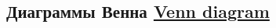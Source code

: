 \documentclass[a4paper,10pt]{article}
\begin{document}
\begin{multicols}{2}
\begin{terms}

\end{terms}
\end{multicols}


\newpage


\subsection{Диаграммы Венна%
\texorpdfstring{\hfill\normalfont\href{https://en.wikipedia.org/wiki/Venn_diagram}{Venn diagram}}{}}

\def\firstcircle{(0,0) circle[radius=1]}
\def\secondcircle{(1.2,0) circle[radius=1]}
\newcommand\drawcircles[1][]{%
    \draw[outline,#1]
        \firstcircle  node[left]  {$A$}
        \secondcircle node[right] {$B$}; }
\newcommand\drawuniverse[1][]{%
    \draw[universe,#1] (-1.1,-1.1) rectangle (2.3,1.6); }
\newcommand\drawlabel[1]{%
    \node[above] at (current bounding box.north) {#1}; }
\end{document}
